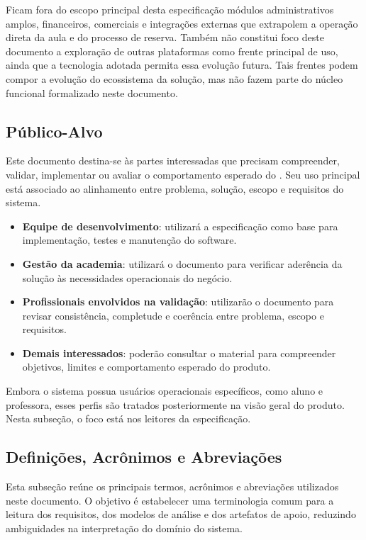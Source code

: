 Ficam fora do escopo principal desta especificação módulos administrativos amplos, financeiros, comerciais e integrações externas que extrapolem a operação direta da aula e do processo de reserva. Também não constitui foco deste documento a exploração de outras plataformas como frente principal de uso, ainda que a tecnologia adotada permita essa evolução futura. Tais frentes podem compor a evolução do ecossistema da solução, mas não fazem parte do núcleo funcional formalizado neste documento.

\subsection{Público-Alvo}

Este documento destina-se às partes interessadas que precisam compreender, validar, implementar ou avaliar o comportamento esperado do \ProjetoNome. Seu uso principal está associado ao alinhamento entre problema, solução, escopo e requisitos do sistema.

\begin{itemize}[leftmargin=1.2cm]
\item \textbf{Equipe de desenvolvimento}: utilizará a especificação como base para implementação, testes e manutenção do software.
\item \textbf{Gestão da academia}: utilizará o documento para verificar aderência da solução às necessidades operacionais do negócio.
\item \textbf{Profissionais envolvidos na validação}: utilizarão o documento para revisar consistência, completude e coerência entre problema, escopo e requisitos.
\item \textbf{Demais interessados}: poderão consultar o material para compreender objetivos, limites e comportamento esperado do produto.
\end{itemize}

Embora o sistema possua usuários operacionais específicos, como aluno e professora, esses perfis são tratados posteriormente na visão geral do produto. Nesta subseção, o foco está nos leitores da especificação.

\subsection{Definições, Acrônimos e Abreviações}

Esta subseção reúne os principais termos, acrônimos e abreviações utilizados neste documento. O objetivo é estabelecer uma terminologia comum para a leitura dos requisitos, dos modelos de análise e dos artefatos de apoio, reduzindo ambiguidades na interpretação do domínio do sistema.

